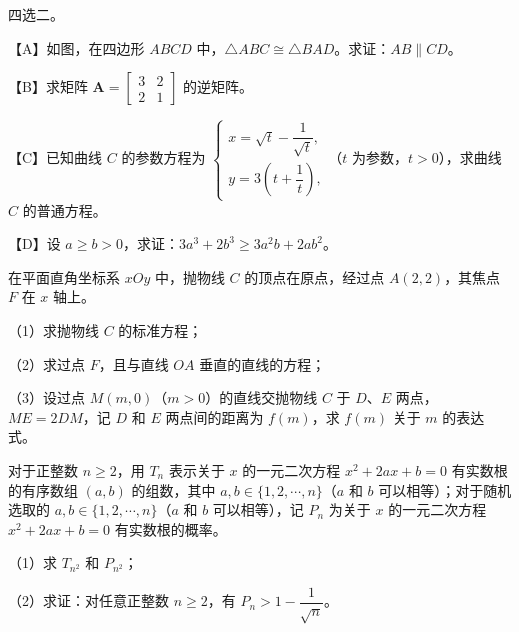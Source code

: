 \Needspace{0.4\textheight}
\begin{question}
四选二。

【A】如图，在四边形 $ABCD$ 中，$\triangle ABC\cong\triangle BAD$。求证：$AB\parallel CD$。
\nopagebreak[4]
\begin{center}\end{center}
\nopagebreak[4]
【B】求矩阵 $\boldsymbol A=\begin{bmatrix}3&2\\2&1\end{bmatrix}$ 的逆矩阵。

【C】已知曲线 $C$ 的参数方程为 $\begin{cases}x=\sqrt t-\dfrac1{\sqrt t},\\ y=3\left(t+\dfrac1t\right),\end{cases}$（$t$ 为参数，$t>0$），求曲线 $C$ 的普通方程。

【D】设 $a\geqslant b>0$，求证：$3a^3+2b^3\geqslant3a^2b+2ab^2$。

\Needspace{0.4\textheight}
\end{question}
\begin{question}
在平面直角坐标系 $xOy$ 中，抛物线 $C$ 的顶点在原点，经过点 $A(2,2)$，其焦点 $F$ 在 $x$ 轴上。

（1）求抛物线 $C$ 的标准方程；

（2）求过点 $F$，且与直线 $OA$ 垂直的直线的方程；

（3）设过点 $M(m,0)$（$m>0$）的直线交抛物线 $C$ 于 $D$、$E$ 两点，$ME=2DM$，记 $D$ 和 $E$ 两点间的距离为 $f(m)$，求 $f(m)$ 关于 $m$ 的表达式。
\nopagebreak[4]
\begin{center}\end{center}
\nopagebreak[4]
\end{question}
\begin{question}
对于正整数 $n\geqslant2$，用 $T_n$ 表示关于 $x$ 的一元二次方程 $x^2+2ax+b=0$ 有实数根的有序数组 $(a,b)$ 的组数，其中 $a,b\in\{1,2,\cdots,n\}$（$a$ 和 $b$ 可以相等）；对于随机选取的 $a,b\in\{1,2,\cdots,n\}$（$a$ 和 $b$ 可以相等），记 $P_n$ 为关于 $x$ 的一元二次方程 $x^2+2ax+b=0$ 有实数根的概率。

（1）求 $T_{n^2}$ 和 $P_{n^2}$；

（2）求证：对任意正整数 $n\geqslant2$，有 $P_n>1-\dfrac1{\sqrt n}$。

\end{question}